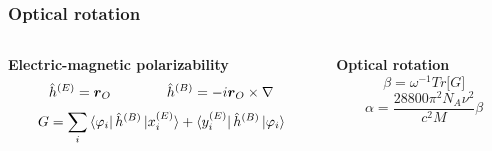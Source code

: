\begin{frame}
\frametitle{Optical rotation}
\begin{columns}

\begin{column}[b]{0.5\textwidth}
\centering
\textbf{Electric-magnetic polarizability}
\begin{equation}
    \nonumber
    \hat{h}^{(E)} = \boldsymbol{r}_O \qquad \qquad
    \hat{h}^{(B)} = -i \boldsymbol{r}_O\times\nabla
\end{equation}
\vspace{4mm}
\begin{equation}
    \nonumber
    G = \sum_i 
    \bra{\varphi_i}\hat{h}^{(B)} \ket{x_i^{(E)}} + 
    \bra{y_i^{(E)}}\hat{h}^{(B)}\ket{\varphi_i}
\end{equation}
\end{column}

\begin{column}[b]{0.5\textwidth}
\centering
\textbf{Optical rotation}
\vspace{2mm}
\begin{equation}
    \nonumber
    \beta = \omega^{-1}Tr\big[G\big]
\end{equation}
\vspace{2mm}
\begin{equation}
    \nonumber
    \alpha = \frac{28800\pi^2N_A\nu^2}{c^2M}\beta
\end{equation}
\end{column}

\end{columns}
\vspace{5mm}


\end{frame}
